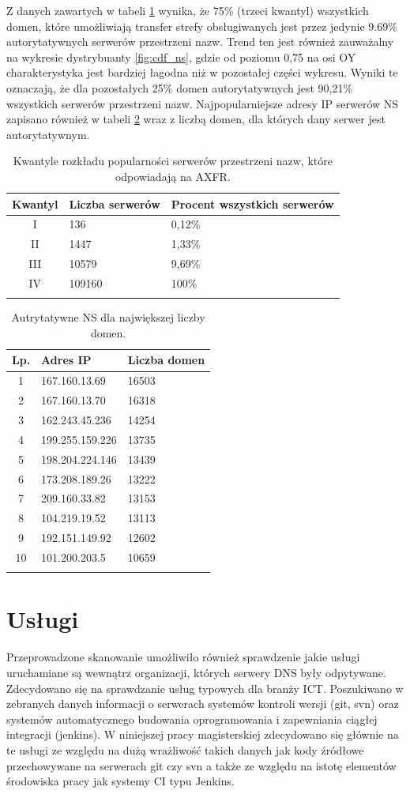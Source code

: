 Z danych zawartych w tabeli \ref{tab_cdf_ns} wynika, że 75\% (trzeci kwantyl) wszystkich domen, które umożliwiają transfer strefy
obsługiwanych jest przez jedynie 9.69\% autorytatywnych serwerów przestrzeni nazw. Trend ten jest również zauważalny na wykresie
dystrybuanty \ref{fig:cdf_ns}, gdzie od poziomu 0,75 na osi OY charakterystyka jest bardziej łagodna niż w pozostałej części wykresu.
Wyniki te oznaczają, że dla pozostałych 25\% domen autorytatywnych jest 90,21\% wszystkich serwerów przestrzeni nazw. Najpopularniejsze
adresy IP serwerów NS zapisano również w tabeli \ref{tab:most_cnt_ns} wraz z liczbą domen, dla których dany serwer jest autorytatywnym.


\begin{longtable}{|c|p{3cm}|p{3cm}|}
	\hline
	\textbf{Kwantyl} &
	\textbf{Liczba serwerów} &
	\textbf{Procent wszystkich serwerów} \\
	\hline\hline
	I & 136 & 0,12\% \\
	II & 1447 & 1,33\% \\
	III & 10579 & 9,69\% \\
	IV & 109160 & 100\% \\
	\hline
	\caption{Kwantyle rozkładu popularności serwerów przestrzeni nazw, które odpowiadają na AXFR.}
	\label{tab_cdf_ns}
\end{longtable}
\begin{longtable}{|c|p{3cm}|p{3cm}|}
	\hline
	\textbf{Lp.} &
	\textbf{Adres IP} &
	\textbf{Liczba domen} \\
	\hline\hline
	1 & 167.160.13.69 & 16503 \\
	2 & 167.160.13.70 & 16318 \\
	3 & 162.243.45.236 & 14254 \\
	4 & 199.255.159.226 & 13735 \\
	5 & 198.204.224.146 & 13439 \\
	6 & 173.208.189.26 & 13222 \\
	7 & 209.160.33.82 & 13153 \\
	8 & 104.219.19.52 & 13113 \\
	9 & 192.151.149.92 & 12602 \\
	10 & 101.200.203.5 & 10659 \\
	\hline
	\caption{Autrytatywne NS dla największej liczby domen.}
	\label{tab:most_cnt_ns}
\end{longtable}

\section{Usługi}
Przeprowadzone skanowanie umożliwiło również sprawdzenie jakie usługi uruchamiane są wewnątrz organizacji, których serwery DNS
były odpytywane. Zdecydowano się na sprawdzanie usług typowych dla branży ICT. Poszukiwano w zebranych danych informacji o serwerach
systemów kontroli wersji (git, svn) oraz systemów automatycznego budowania oprogramowania i zapewniania ciągłej integracji (jenkins).
W niniejszej pracy magisterskiej zdecydowano się głównie na te usługi ze względu na dużą wrażliwość takich danych jak kody źródłowe
przechowywane na serwerach git czy svn a także ze względu na istotę elementów środowiska pracy jak systemy CI typu Jenkins.

